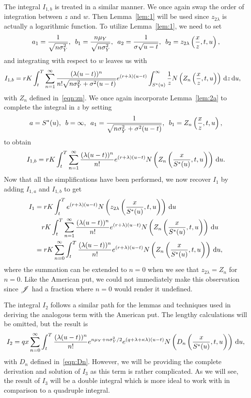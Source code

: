        	The integral $I_{1,b}$ is treated in a similar manner. We once again swap the order of integration between $z$ and $w$. Then Lemma~\ref{lem:1} will be used since $z_{2\lambda}$ is actually a logarithmic function. To utilize Lemma~\ref{lem:1}, we need to set
        		$$
        			a_1 = \frac{1}{\sqrt{n\sigma_Y^2}}, \enskip b_1 = \frac{n\mu_Y}{\sqrt{n\sigma_Y^2}}, \enskip
        			a_2 = \frac{1}{\sigma\sqrt{u-t}}, \enskip b_2 = z_{2\lambda}\left( \frac{x}{z}, t, u\right),
        		$$
	and integrating with respect to $w$ leaves us with
			\begin{align*}
				I_{1,b} &= rK  \int_t^T  \displaystyle\sum\limits_{n=1}^{\infty} \frac{(\lambda(u-t))^n}{n!\sqrt{n\sigma_Y^2 + \sigma^2(u-t)}}  e^{(r+\lambda)(u-t)} \int_{S^*(u)}^\infty \frac{1}{z}  N\left(Z_n \left( \frac{x}{z},t,u  \right) \right) \,\mathrm d z \, \mathrm d u,
			\end{align*}
	with $Z_n$ defined in~\eqref{eqn:zn}. We once again incorporate Lemma~\ref{lem:2a} to complete the integral in $z$ by setting 
		$$
			a = S^*(u), \enskip b = \infty, \enskip a_1 = \frac{1}{\sqrt{n\sigma_Y^2 + \sigma^2(u-t)}}, \enskip
			b_1 = Z_n\left( \frac{x}{z}, t, u \right),
		$$
		to obtain
		$$
			I_{1,b} = rK  \int_t^T  \displaystyle\sum\limits_{n=1}^{\infty} \frac{(\lambda(u-t))^n}{n!}  e^{(r+\lambda)(u-t)} N\left(Z_n \left( \frac{x}{S^*(u)},t,u  \right) \right) \, \mathrm d u.
		$$
		Now that all the simplifications have been performed, we now recover $I_1$ by adding $I_{1,a}$ and $I_{1,b}$ to get
		\begin{align}
			I_1 &= rK\int_t^T e^{(r+\lambda)(u-t)}N\left(z_{2\lambda}\left( \frac{x}{S^*(u)},t,u\right) \right) \, \mathrm d u \nonumber \\
			 &\quad rK  \int_t^T  \displaystyle\sum\limits_{n=1}^{\infty} \frac{(\lambda(u-t))^n}{n!}  e^{(r+\lambda)(u-t)} N\left(Z_n \left( \frac{x}{S^*(u)},t,u  \right) \right) \, \mathrm d u \nonumber \\
			 &= rK \displaystyle\sum\limits_{n=0}^{\infty}\int_t^T  \frac{(\lambda(u-t))^n}{n!} e^{(r+\lambda)(u-t)} N\left(Z_n \left( \frac{x}{S^*(u)},t,u  \right) \right) \, \mathrm d u, \label{eqn:I1call}
		\end{align}
		where the summation can be extended to $n=0$ when we see that $z_{2\lambda} = Z_n$ for $n=0$. Like the American put, we could not immediately make this observation since $\mathscr J$ had a fraction where $n=0$ would render it undefined. 
		
		The integral $I_2$ follows a similar path for the lemmas and techniques used in deriving the analogous term with the American put. The lengthy calculations will be omitted, but the result is
        	\begin{equation}
        		\label{eqn:I2put}
        		I_2 = qx  \displaystyle\sum\limits_{n=0}^{\infty}\int_t^T   \frac{(\lambda(u-t))^n}{n!} e^{n\mu_Y + n\sigma_Y^2/2} e^{(q+\lambda + \kappa\lambda)(u-t)} N\left( D_n \left( \frac{x}{S^*(u)},t,u  \right) \right) \, \mathrm d u,
        	\end{equation}
	with $D_n$ defined in~\eqref{eqn:Dn}. 
	However, we will be providing the complete derivation and solution of $I_3$ as this term is rather complicated. As we will see, the result of $I_3$ will be a double integral which is more ideal to work with in comparison to a quadruple integral. 
	
